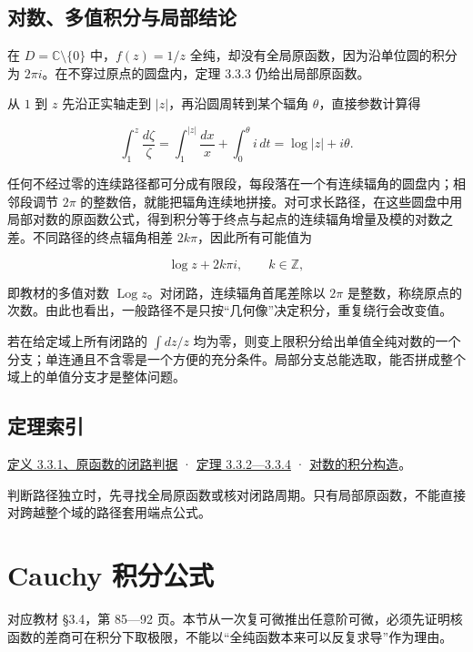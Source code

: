 \documentclass[11pt,a4paper]{article}
\begin{document}
\subsection{对数、多值积分与局部结论}\label{ch03-s3-ux5bf9ux6570ux591aux503cux79efux5206ux4e0eux5c40ux90e8ux7ed3ux8bba}

在 \(D=\mathbb C\setminus\{0\}\) 中，\(f(z)=1/z\)
全纯，却没有全局原函数，因为沿单位圆的积分为
\(2\pi i\)。在不穿过原点的圆盘内，定理 3.3.3 仍给出局部原函数。

从 \(1\) 到 \(z\) 先沿正实轴走到 \(|z|\)，再沿圆周转到某个辐角
\(\theta\)，直接参数计算得

\[
\int_1^{z}\frac{d\zeta}{\zeta}
=\int_1^{|z|}\frac{dx}{x}+\int_0^\theta i\,dt
=\log|z|+i\theta.
\]

任何不经过零的连续路径都可分成有限段，每段落在一个有连续辐角的圆盘内；相邻段调节
\(2\pi\)
的整数倍，就能把辐角连续地拼接。对可求长路径，在这些圆盘中用局部对数的原函数公式，得到积分等于终点与起点的连续辐角增量及模的对数之差。不同路径的终点辐角相差
\(2k\pi\)，因此所有可能值为

\[
\log z+2k\pi i,\qquad k\in\mathbb Z,
\]

即教材的多值对数 \(\operatorname{Log}z\)。对闭路，连续辐角首尾差除以
\(2\pi\)
是整数，称绕原点的次数。由此也看出，一般路径不是只按``几何像''决定积分，重复绕行会改变值。

若在给定域上所有闭路的 \(\int dz/z\)
均为零，则变上限积分给出单值全纯对数的一个分支；单连通且不含零是一个方便的充分条件。局部分支总能选取，能否拼成整个域上的单值分支才是整体问题。

\subsection{定理索引}\label{ch03-s3-ux5b9aux7406ux7d22ux5f15}

\hyperref[ch03-s3-ux539fux51fdux6570ux4e0eux95edux8defux5468ux671f]{定义
3.3.1、原函数的闭路判据} ·
\hyperref[ch03-s3-ux4eceux79efux5206ux6784ux9020ux539fux51fdux6570]{定理
3.3.2---3.3.4} ·
\hyperref[ch03-s3-ux5bf9ux6570ux591aux503cux79efux5206ux4e0eux5c40ux90e8ux7ed3ux8bba]{对数的积分构造}。

判断路径独立时，先寻找全局原函数或核对闭路周期。只有局部原函数，不能直接对跨越整个域的路径套用端点公式。

\section{Cauchy 积分公式}
对应教材 §3.4，第 85---92
页。本节从一次复可微推出任意阶可微，必须先证明核函数的差商可在积分下取极限，不能以``全纯函数本来可以反复求导''作为理由。
\end{document}
